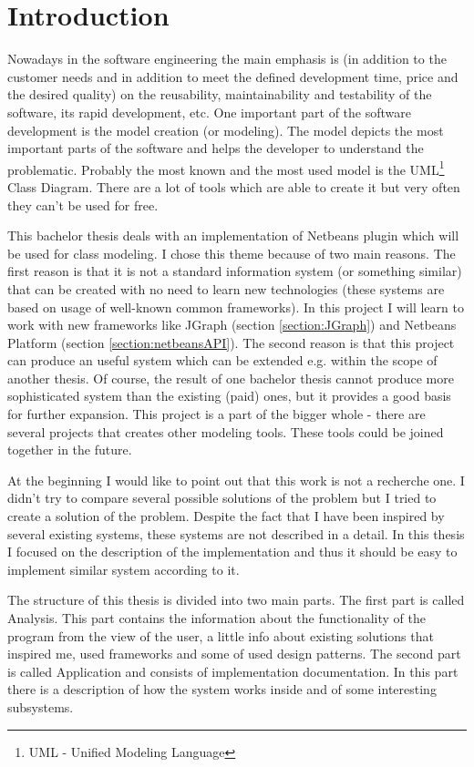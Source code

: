 \chapter{Introduction}

Nowadays in the software engineering the main emphasis is (in addition to the customer needs and in addition to meet the defined development time, price and the desired quality) on the reusability, maintainability and testability of the software, its rapid development, etc. One important part of the software development is the model creation (or modeling). The model depicts the most important parts of the software and helps the developer to understand the problematic. Probably the most known and the most used model is the UML\footnote{UML - Unified Modeling Language} Class Diagram. There are a lot of tools which are able to create it but very often they can't be used for free.

This bachelor thesis deals with an implementation of Netbeans plugin which will be used for class modeling. I chose this theme because of two main reasons. The first reason is that it is not a standard information system (or something similar) that can be created with no need to learn new technologies (these systems are based on usage of well-known common frameworks). In this project I will learn to work with new frameworks like JGraph (section \ref{section:JGraph}) and Netbeans Platform (section \ref{section:netbeansAPI}). The second reason is that this project can produce an useful system which can be extended e.g. within the scope of another thesis. Of course, the result of one bachelor thesis cannot produce more sophisticated system than the existing (paid) ones, but it provides a good basis for further expansion. This project is a part of the bigger whole - there are several projects that creates other modeling tools. These tools could be joined together in the future.

At the beginning I would like to point out that this work is not a recherche one. I didn't try to compare several possible solutions of the problem but I tried to create a solution of the problem. Despite the fact that I have been inspired by several existing systems, these systems are not described in a detail. In this thesis I focused on the description of the implementation and thus it should be easy to implement similar system according to it.

The structure of this thesis is divided into two main parts. The first part is called Analysis. This part contains the information about the functionality of the program from the view of the user, a little info about existing solutions that inspired me, used frameworks and some of used design patterns. The second part is called Application and consists of implementation documentation. In this part there is a description of how the system works inside and of some interesting subsystems.

